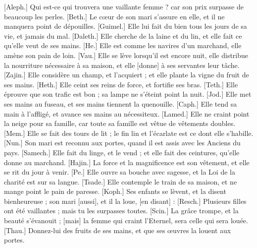 \begin{multicols}{2}
[Aleph.] Qui est-ce qui trouvera une vaillante femme ? car son prix surpasse de beaucoup les perles.
[Beth.] Le cœur de son mari s'assure en elle, et il ne manquera point de dépouilles.
[Guimel.] Elle lui fait du bien tous les jours de sa vie, et jamais du mal.
[Daleth.] Elle cherche de la laine et du lin, et elle fait ce qu'elle veut de ses mains.
[He.] Elle est comme les navires d'un marchand, elle amène son pain de loin.
[Vau.] Elle se lève lorsqu'il est encore nuit, elle distribue la nourriture nécessaire à sa maison, et elle [donne] à ses servantes leur tâche.
[Zajin.] Elle considère un champ, et l'acquiert ; et elle plante la vigne du fruit de ses mains.
[Heth.] Elle ceint ses reins de force, et fortifie ses bras.
[Teth.] Elle éprouve que son trafic est bon ; sa lampe ne s'éteint point la nuit.
[Jod.] Elle met ses mains au fuseau, et ses mains tiennent la quenouille.
[Caph.] Elle tend sa main à l'affligé, et avance ses mains au nécessiteux.
[Lamed.] Elle ne craint point la neige pour sa famille, car toute sa famille est vêtue de vêtements doubles.
[Mem.] Elle se fait des tours de lit ; le fin lin et l'écarlate est ce dont elle s'habille.
[Nun.] Son mari est reconnu aux portes, quand il est assis avec les Anciens du pays.
[Samech.] Elle fait du linge, et le vend ; et elle fait des ceintures, qu'elle donne au marchand.
[Hajin.] La force et la magnificence est son vêtement, et elle se rit du jour à venir.
[Pe.] Elle ouvre sa bouche avec sagesse, et la Loi de la charité est sur sa langue.
[Tsade.] Elle contemple le train de sa maison, et ne mange point le pain de paresse.
[Koph.] Ses enfants se lèvent, et la disent bienheureuse ; son mari [aussi], et il la loue, [en disant] :
[Resch.] Plusieurs filles ont été vaillantes ; mais tu les surpasses toutes.
[Scin.] La grâce trompe, et la beauté s'évanouit ; [mais] la femme qui craint l'Eternel, sera celle qui sera louée.
[Thau.] Donnez-lui des fruits de ses mains, et que ses œuvres la louent aux portes.
\PPE{}
\end{multicols}
